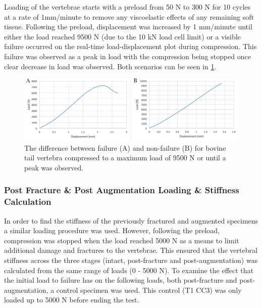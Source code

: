 Loading of the vertebrae starts with a preload from 50 N to 300 N for
10 cycles at a rate of 1mm/minute to remove any viscoelastic effects of any remaining soft
tissue. Following the preload, displacement was increased by 1 mm/minute
until either the load reached 9500 N (due to the 10 kN load cell limit)
or a visible failure occurred on the real-time load-displacement plot during compression.
This failure was observed as a peak in load with the compression being stopped once
clear decrease in load was observed. Both scenarios can be seen in \cref{fig:failure_non_failure}.



\begin{figure}[ht!]
\centering
\includegraphics[width=16cm]{images/comparing_failureand_nonfailure.png}
\caption{The difference between failure (A) and non-failure (B) for bovine tail vertebra compressed to a maximum load of 9500 N or until a peak was observed.}
\label{fig:failure_non_failure}
\end{figure}

\subsubsection{Post Fracture \& Post
Augmentation Loading \& Stiffness
Calculation}\label{post-fracture-post-vertebroplasty}

In order to find the stiffness of the previously fractured and augmented
specimens a similar loading procedure was used. However, following the
preload, compression was stopped when the load reached 5000 N as a means
to limit additional damage and fractures to the vertebrae. This ensured that the vertebral stiffness across the three stages (intact,
post-fracture and post-augmentation) was calculated from the same range of loads (0 - 5000 N). To examine the effect that the initial load to failure has on the following loads, both post-fracture and post-augmentation, a control specimen was used. This control (T1 CC3) was only loaded up to 5000 N before ending the test.




